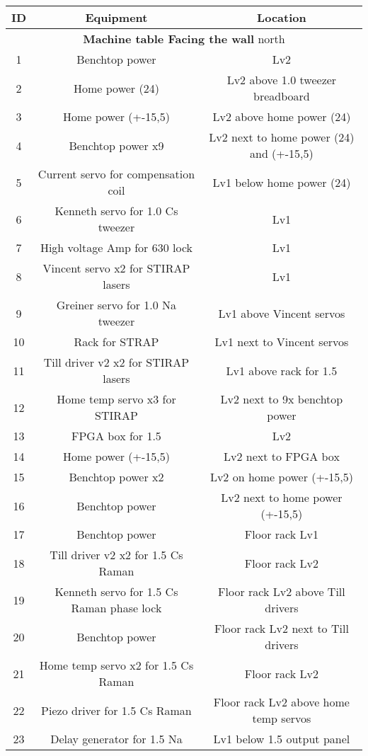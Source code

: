 \documentclass[10pt,fleqn,twocolumn]{article}
\begin{document}
\begin{longtable}{|c|c|c|}
  \hline
  \textbf{ID}&\textbf{Equipment}&\textbf{Location}\\\hline
  \multicolumn{3}{|c|}{\textbf{Machine table Facing the wall} north}\\\hline
  1&Benchtop power&Lv2\\\hline
  2&Home power (24)&Lv2 above 1.0 tweezer breadboard\\\hline
  3&Home power (+-15,5)&Lv2 above home power (24)\\\hline
  4&Benchtop power x9&Lv2 next to home power (24) and (+-15,5)\\\hline
  5&Current servo for compensation coil&Lv1 below home power (24)\\\hline
  6&Kenneth servo for 1.0 Cs tweezer&Lv1\\\hline
  7&High voltage Amp for 630 lock&Lv1\\\hline
  8&Vincent servo x2 for STIRAP lasers&Lv1\\\hline
  9&Greiner servo for 1.0 Na tweezer&Lv1 above Vincent servos\\\hline
  10&Rack for STRAP&Lv1 next to Vincent servos\\\hline
  11&Till driver v2 x2 for STIRAP lasers&Lv1 above rack for 1.5\\\hline
  12&Home temp servo x3 for STIRAP&Lv2 next to 9x benchtop power\\\hline
  13&FPGA box for 1.5&Lv2\\\hline
  14&Home power (+-15,5)&Lv2 next to FPGA box\\\hline
  15&Benchtop power x2&Lv2 on home power (+-15,5)\\\hline
  16&Benchtop power&Lv2 next to home power (+-15,5)\\\hline
  17&Benchtop power&Floor rack Lv1\\\hline
  18&Till driver v2 x2 for 1.5 Cs Raman&Floor rack Lv2\\\hline
  19&Kenneth servo for 1.5 Cs Raman phase lock&Floor rack Lv2 above Till drivers\\\hline
  20&Benchtop power&Floor rack Lv2 next to Till drivers\\\hline
  21&Home temp servo x2 for 1.5 Cs Raman&Floor rack Lv2\\\hline
  22&Piezo driver for 1.5 Cs Raman&Floor rack Lv2 above home temp servos\\\hline
  23&Delay generator for 1.5 Na&Lv1 below 1.5 output panel\\\hline

\end{longtable}
\end{document}
